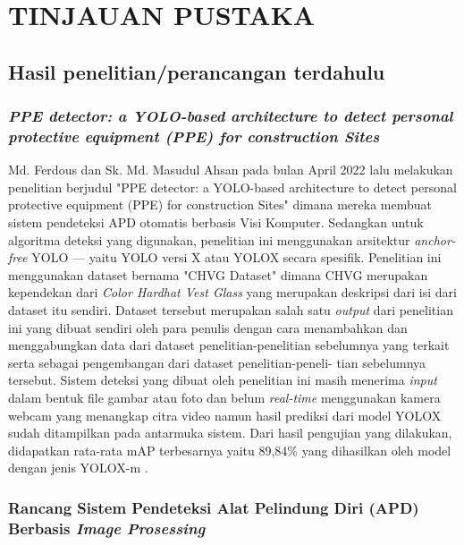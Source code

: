 \chapter{TINJAUAN PUSTAKA}

\section{Hasil penelitian/perancangan terdahulu}

\subsection{\emph{PPE detector: a YOLO-based architecture to detect personal protective equipment (PPE) for construction Sites}}

Md. Ferdous dan Sk. Md. Masudul Ahsan pada bulan April 2022 lalu melakukan penelitian berjudul "PPE detector: a YOLO-based architecture to detect personal protective equipment (PPE) for construction Sites" dimana mereka membuat sistem pendeteksi APD otomatis berbasis Visi Komputer. Sedangkan untuk algoritma deteksi yang digunakan, penelitian ini menggunakan arsitektur \emph{anchor-free} YOLO --- yaitu YOLO versi X atau YOLOX secara spesifik. Penelitian ini menggunakan dataset bernama "CHVG Dataset" dimana CHVG merupakan kependekan dari \emph{Color Hardhat Vest Glass} yang merupakan deskripsi dari isi dari dataset itu sendiri. Dataset tersebut merupakan salah satu \emph{output} dari penelitian ini yang dibuat sendiri oleh para penulis dengan cara menambahkan dan menggabungkan data dari dataset penelitian-penelitian sebelumnya yang terkait serta sebagai pengembangan dari dataset penelitian-peneli- tian sebelumnya tersebut. Sistem deteksi yang dibuat oleh penelitian ini masih menerima \emph{input} dalam bentuk file gambar atau foto dan belum \emph{real-time} menggunakan kamera webcam yang menangkap citra video namun hasil prediksi dari model YOLOX sudah ditampilkan pada antarmuka sistem. Dari hasil pengujian yang dilakukan, didapatkan rata-rata mAP terbesarnya yaitu 89,84\% yang dihasilkan oleh model dengan jenis YOLOX-m \cite{ferdous_ahsan_2022}.

\subsection{Rancang Sistem Pendeteksi Alat Pelindung Diri (APD) Berbasis \emph{Image Prosessing}}

